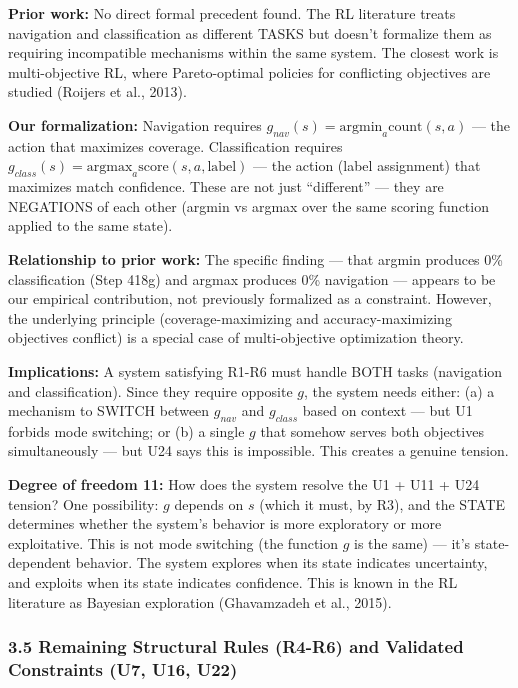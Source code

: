 \documentclass[
  11pt,
]{article}
\begin{document}
\textbf{Prior work:} No direct formal precedent found. The RL literature
treats navigation and classification as different TASKS but doesn't
formalize them as requiring incompatible mechanisms within the same
system. The closest work is multi-objective RL, where Pareto-optimal
policies for conflicting objectives are studied (Roijers et al., 2013).

\textbf{Our formalization:} Navigation requires
\(g_{nav}(s) = \text{argmin}_a \text{count}(s, a)\) --- the action that
maximizes coverage. Classification requires
\(g_{class}(s) = \text{argmax}_a \text{score}(s, a, \text{label})\) ---
the action (label assignment) that maximizes match confidence. These are
not just ``different'' --- they are NEGATIONS of each other (argmin vs
argmax over the same scoring function applied to the same state).

\textbf{Relationship to prior work:} The specific finding --- that
argmin produces 0\% classification (Step 418g) and argmax produces 0\%
navigation --- appears to be our empirical contribution, not previously
formalized as a constraint. However, the underlying principle
(coverage-maximizing and accuracy-maximizing objectives conflict) is a
special case of multi-objective optimization theory.

\textbf{Implications:} A system satisfying R1-R6 must handle BOTH tasks
(navigation and classification). Since they require opposite \(g\), the
system needs either: (a) a mechanism to SWITCH between \(g_{nav}\) and
\(g_{class}\) based on context --- but U1 forbids mode switching; or (b)
a single \(g\) that somehow serves both objectives simultaneously ---
but U24 says this is impossible. This creates a genuine tension.

\textbf{Degree of freedom 11:} How does the system resolve the U1 + U11
+ U24 tension? One possibility: \(g\) depends on \(s\) (which it must,
by R3), and the STATE determines whether the system's behavior is more
exploratory or more exploitative. This is not mode switching (the
function \(g\) is the same) --- it's state-dependent behavior. The
system explores when its state indicates uncertainty, and exploits when
its state indicates confidence. This is known in the RL literature as
Bayesian exploration (Ghavamzadeh et al., 2015).

\subsubsection{3.5 Remaining Structural Rules (R4-R6) and Validated
Constraints (U7, U16,
U22)}\label{remaining-structural-rules-r4-r6-and-validated-constraints-u7-u16-u22}
\end{document}
